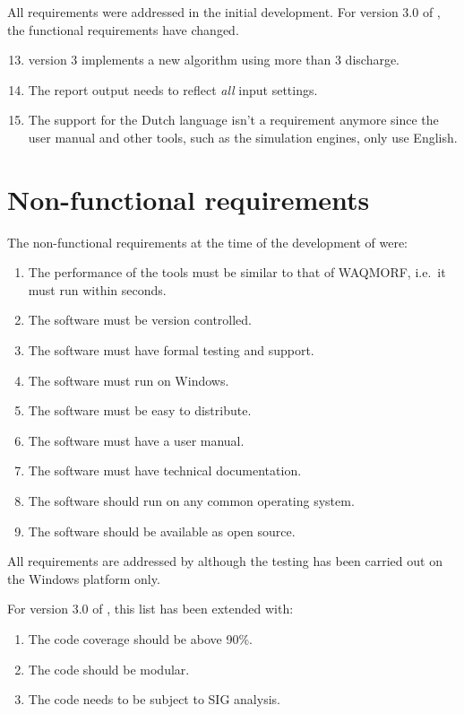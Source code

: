 All requirements were addressed in the initial development.
For version 3.0 of \dfastmi, the functional requirements have changed.

\begin{enumerate}
\setcounter{enumi}{12} %
\item \dfastmi version 3 implements a new algorithm using more than 3 discharge.
\item The report output needs to reflect \emph{all} input settings.
\item The support for the Dutch language isn't a requirement anymore since the user manual and other tools, such as the simulation engines, only use English.
\end{enumerate}


\section{Non-functional requirements}

The non-functional requirements at the time of the development of  were:

\begin{enumerate}
\item The performance of the tools must be similar to that of WAQMORF, i.e.~it must run within seconds.
\item The software must be version controlled.
\item The software must have formal testing and support.
\item The software must run on Windows.
\item The software must be easy to distribute.
\item The software must have a user manual.
\item The software must have technical documentation.

\item The software should run on any common operating system.
\item The software should be available as open source.
\end{enumerate}

All requirements are addressed by \dfastmi although the testing has been carried out on the Windows platform only.

For version 3.0 of \dfastmi, this list has been extended with:

\begin{enumerate}
\item The code coverage should be above 90\%.
\item The code should be modular.
\item The code needs to be subject to SIG analysis.
\end{enumerate}


